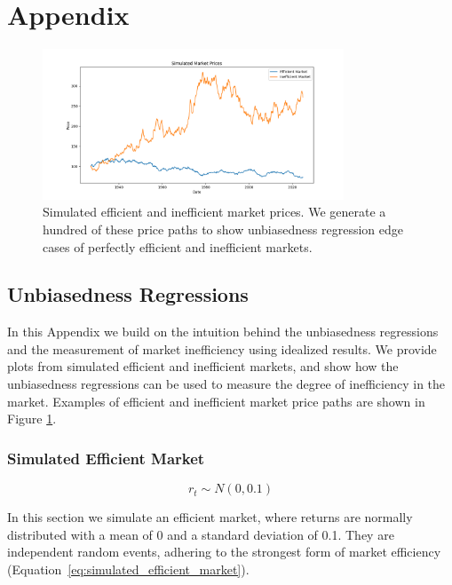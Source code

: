 \section{Appendix}
\label{sec:appendix}

\begin{figure}[h!]
    \centering
    \includegraphics[width=0.8\textwidth]{../figs/Sample Simulated Market Prices.png}
    \caption{Simulated efficient and inefficient market prices. We generate a hundred of these price paths to show
    unbiasedness regression edge cases of perfectly efficient and inefficient markets.}
    \label{fig:sample_simulated_market}
\end{figure}

\subsection{Unbiasedness Regressions}
In this Appendix we build on the intuition behind the unbiasedness regressions and the measurement of market inefficiency using idealized results.
We provide plots from simulated efficient and inefficient markets, and show how the unbiasedness regressions can be used to measure the degree of inefficiency in the market.
Examples of efficient and inefficient market price paths are shown in Figure \ref{fig:sample_simulated_market}.

\subsubsection{Simulated Efficient Market}
\begin{equation}
    r_t \sim N(0, 0.1)
    \label{eq:simulated_efficient_market}
\end{equation}

In this section we simulate an efficient market, where returns are normally distributed with a mean of 0 and a standard deviation of 0.1.
They are independent random events, adhering to the strongest form of market efficiency (Equation~\ref{eq:simulated_efficient_market}).

